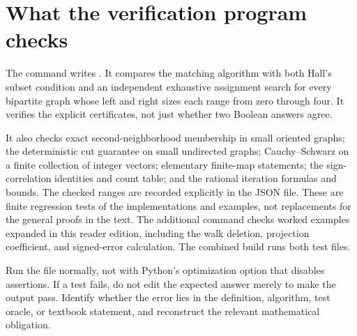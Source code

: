 \section{What the verification program checks}
The command  writes . It compares the matching algorithm with both Hall's subset condition and an independent exhaustive assignment search for every bipartite graph whose left and right sizes each range from zero through four. It verifies the explicit certificates, not just whether two Boolean answers agree.

It also checks exact second-neighborhood membership in small oriented graphs; the deterministic cut guarantee on small undirected graphs; Cauchy--Schwarz on a finite collection of integer vectors; elementary finite-map statements; the sign-correlation identities and count table; and the rational iteration formulas and bounds. The checked ranges are recorded explicitly in the JSON file. These are finite regression tests of the implementations and examples, not replacements for the general proofs in the text. The additional command  checks worked examples expanded in this reader edition, including the walk deletion, projection coefficient, and signed-error calculation. The combined build runs both test files.

Run the file normally, not with Python's optimization option that disables assertions. If a test fails, do not edit the expected answer merely to make the output pass. Identify whether the error lies in the definition, algorithm, test oracle, or textbook statement, and reconstruct the relevant mathematical obligation.
